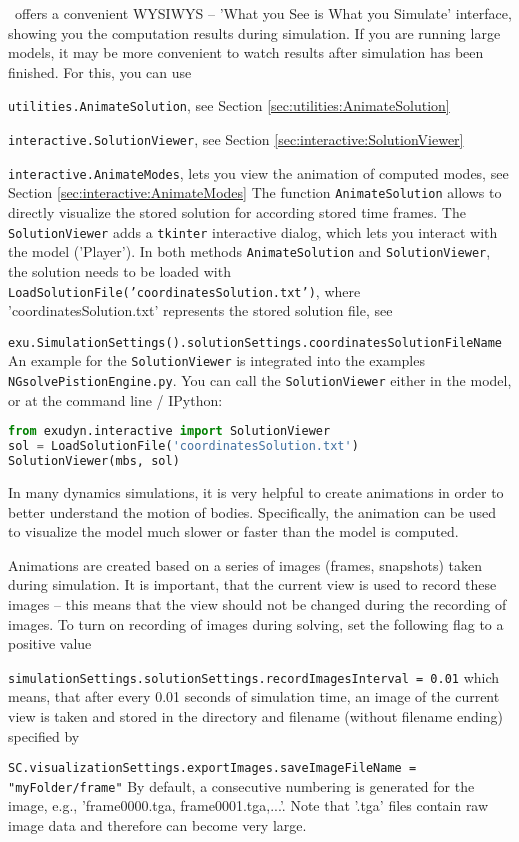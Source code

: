 \label{secSolutionViewer}
\codeName\ offers a convenient WYSIWYS -- 'What you See is What you Simulate' interface, showing you the computation results during simulation.
If you are running large models, it may be more convenient to watch results after simulation has been finished.
For this, you can use
\bi
  \item \texttt{utilities.AnimateSolution}, see Section \ref{sec:utilities:AnimateSolution}
  \item \texttt{interactive.SolutionViewer}, see Section \ref{sec:interactive:SolutionViewer}
  \item \texttt{interactive.AnimateModes}, lets you view the animation of computed modes, see Section \ref{sec:interactive:AnimateModes}
\ei
The function \texttt{AnimateSolution} allows to directly visualize the stored solution for according stored time frames.
The \texttt{SolutionViewer} adds a \texttt{tkinter} interactive dialog, which lets you interact with the model ('Player').
In both methods \texttt{AnimateSolution} and \texttt{SolutionViewer}, the solution needs to be loaded with
\texttt{LoadSolutionFile('coordinatesSolution.txt')}, where 'coordinatesSolution.txt' represents the stored solution file, 
see 
\bi
  \item \texttt{exu.SimulationSettings().solutionSettings.coordinatesSolutionFileName}
\ei
An example for the \texttt{SolutionViewer} is integrated into the examples \texttt{NGsolvePistionEngine.py}. You can call the \texttt{SolutionViewer} either in the model, or at the command line / IPython:
\pythonstyle
\begin{lstlisting}[language=Python, firstnumber=1]
from exudyn.interactive import SolutionViewer
sol = LoadSolutionFile('coordinatesSolution.txt')
SolutionViewer(mbs, sol)
\end{lstlisting}


\label{secGeneratingAnimations}
%
In many dynamics simulations, it is very helpful to create animations in order to better understand the motion of bodies. Specifically, the animation can be used to visualize the model much slower or faster than the model is computed.

Animations are created based on a series of images (frames, snapshots) taken during simulation. It is important, that the current view is used to record these images -- this means that the view should not be changed during the recording of images.
To turn on recording of images during solving, set the following flag to a positive value
\bi
  \item \texttt{simulationSettings.solutionSettings.recordImagesInterval = 0.01}
\ei
which means, that after every 0.01 seconds of simulation time, an image of the current view is taken and stored in the directory and filename (without filename ending) specified by 
\bi
  \item \texttt{SC.visualizationSettings.exportImages.saveImageFileName = "myFolder/frame"}
\ei
By default, a consecutive numbering is generated for the image, e.g., 'frame0000.tga, frame0001.tga,...'. Note that '.tga' files contain raw image data and therefore can become very large.

